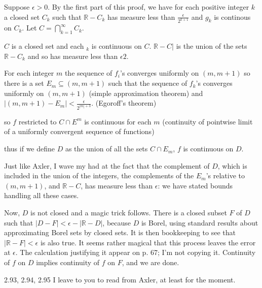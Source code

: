 \documentclass[12pt]{article}
\begin{document}
Suppose $\epsilon>0$.  By the first part of this proof, we have for each positive integer $k$ a closed set $C_k$ such that $\mathbb R -C_k$ has measure less than $\frac\epsilon{2^{k+1}}$ and $g_k$ is continous on $C_k$.  Let $C=\bigcap_{k=1}^\infty C_k$.

$C$ is a closed set and each $_k$ is continuous on $C$.  $\mathbb R - C|$ is the union of the sets $\mathbb R - C_k$ and so has measure less than $\epsilon2$.

For each integer $m$ the sequence of $f_i$'s converges uniformly on $(m,m+1)$ so there is a set $E_m \subseteq (m,m+1)$ such that
the sequence of $f_k$'s converges uniformly on $(m,m+1)$ (simple approximation theorem) and  \newline $|(m,m+1) - E_m|<\frac\epsilon{2^{|m|+3}}$.   (Egoroff's theorem)

so $f$ restricted to $C \cap E^m$ is continuous for each $m$ (continuity of pointwise limit of a uniformly convergent sequence of functions)

thus if we define $D$ as the union of all the sets $C\cap E_m$, $f$ is continuous on $D$.

Just like Axler, I wave my had at the fact that the complement of $D$, which is included in the union of the integers, the complements of the $E_m$'s relative to $(m,m+1)$, and $\mathbb R-C$, has measure less than $\epsilon$:  we have stated bounds handling all these cases.

Now, $D$ is not closed and a magic trick follows.  There is a closed subset $F$ of $D$ such that $|D-F| < \epsilon - |\mathbb R-D|$, because $D$ is Borel, using standard results about approximating Borel sets by closed sets.  It is then bookkeeping to see that $|\mathbb R - F|<\epsilon$ is also true.
It seems rather magical that this process leaves the error at $\epsilon$.  The calculation justifying it appear on p. 67; I'm not copying it.  Continuity of $f$ on $D$ implies continuity of $f$ on $F$, and we are done.

2.93, 2.94, 2.95 I leave to you to read from Axler, at least  for the moment.
\end{document}
